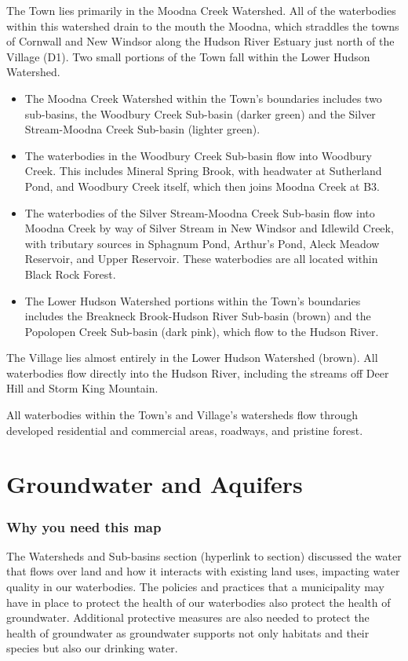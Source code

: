 The Town lies primarily in the Moodna Creek Watershed. All of the waterbodies 
within this watershed drain to the mouth the Moodna, which straddles the towns 
of Cornwall and New Windsor along the Hudson River Estuary just north of the 
Village (D1). Two small portions of the Town fall within the Lower Hudson 
Watershed.
\begin{itemize}
  \item The Moodna Creek Watershed within the Town's boundaries includes two 
    sub-basins, the Woodbury Creek Sub-basin (darker green) and the 
    Silver Stream-Moodna Creek Sub-basin (lighter green).
  \item The waterbodies in the Woodbury Creek Sub-basin flow into Woodbury 
    Creek. This includes Mineral Spring Brook, with headwater at Sutherland 
    Pond, and Woodbury Creek itself, which then joins Moodna Creek at B3.
  \item The waterbodies of the Silver Stream-Moodna Creek Sub-basin flow 
    into Moodna Creek by way of Silver Stream in New Windsor and Idlewild 
    Creek, with tributary sources in Sphagnum Pond, Arthur’s Pond, Aleck Meadow 
    Reservoir, and Upper Reservoir. These waterbodies are all located within 
    Black Rock Forest.
  \item The Lower Hudson Watershed portions within the Town's boundaries 
    includes the Breakneck Brook-Hudson River Sub-basin (brown) and the 
    Popolopen Creek Sub-basin (dark pink), which flow to the Hudson River.
\end{itemize}
The Village lies almost entirely in the Lower Hudson Watershed (brown). All 
waterbodies flow directly into the Hudson River, including the streams off Deer 
Hill and Storm King Mountain.

All waterbodies within the Town’s and Village’s watersheds flow through 
developed residential and commercial areas, roadways, and pristine forest.

\label{map:watershedsandsubbasins}

\chapter{Groundwater and Aquifers}\label{subsec:groundwater}
\subsection*{Why you need this map}
The Watersheds and Sub-basins section (hyperlink to section) discussed the 
water that flows over land and how it interacts with existing land uses, 
impacting water quality in our waterbodies. The policies and practices that a 
municipality may have in place to protect the health of our waterbodies also 
protect the health of groundwater. Additional protective measures are also 
needed to protect the health of groundwater as groundwater supports not only 
habitats and their species but also our drinking water.

